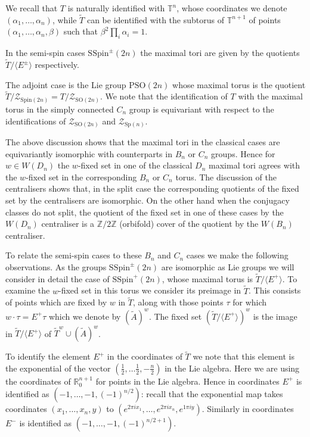 \documentclass[11pt,a4paper]{article}
\def\SSpin{\mathrm{SSpin}}
\def\Spin{\mathrm{Spin}}
\def\SO{\mathrm{SO}}
\def\PSO{\mathrm{PSO}}
\def\Sp{\mathrm{Sp}}
\def\SSpin{\mathrm{SSpin}}
\def\R{\mathbb{R}}
\def\Z{\mathbb{Z}}
\def\Atilde{(\widetilde{A})}
\def\TT{\mathbb{T}}
\def\cZ{\mathcal{Z}}
\def\cZ{{\mathcal Z}}
\def\coveringtorus{\tilde{T}}
\def\ZDSpin{\cZ_{\Spin(2n)}}
\def\ZDSO{\cZ_{\SO(2n)}}
\def\ZCSp{\cZ_{\Sp(n)}}
\begin{document}
We recall that $T$ is naturally identified with $\TT^n$, whose coordinates we denote $(\alpha_1,\dots, \alpha_n)$, while $\coveringtorus$ can be identified with the subtorus of $\TT^{n+1}$ of points $(\alpha_1,\dots, \alpha_n,\beta)$ such that $\beta^2\prod_i\alpha_i=1$.


\bigskip

In the semi-spin cases $\SSpin^\pm(2n)$ the maximal tori are given by the quotients $\coveringtorus / \langle E^\pm\rangle$ respectively. 



The adjoint case is the Lie group $\PSO(2n)$ whose maximal torus is the quotient $\coveringtorus/\ZDSpin=T/\ZDSO$. We note that the identification of $T$ with the maximal torus in the simply connected $C_n$ group is equivariant with respect to the identifications of $\ZDSO$ and $\ZCSp$.

\bigskip







The above discussion shows that  the maximal tori in the classical cases are equivariantly isomorphic with counterparts in $B_n$ or $C_n$ groups. Hence for $w\in W(D_n)$ the $w$-fixed set in one of the classical $D_n$ maximal tori agrees with the $w$-fixed set in the corresponding $B_n$ or $C_n$ torus. The  discussion of the centralisers shows that, in the split case
the corresponding quotients of the fixed set by the centralisers are isomorphic.  On the other hand when the conjugacy classes do not split, the quotient of the fixed set in one of these cases by the $W(D_n)$ centraliser is  a $\Z/2\Z$ (orbifold) cover of the quotient by the $W(B_n)$ centraliser. 

\bigskip

To relate the semi-spin cases to these $B_n$ and $C_n$ cases we make the following observations.  As the groups $\SSpin^\pm(2n)$ are isomorphic as Lie groups we will consider in detail the case of $\SSpin^+(2n)$, whose maximal torus is $\coveringtorus / \langle E^+\rangle$. To examine the $w$-fixed set in this torus we consider its preimage in $\coveringtorus$.  This consists of points which are fixed by $w$ in $\coveringtorus$, along with those points $\tau$ for which $w\cdot \tau =E^+\tau$ which we denote by $\Atilde^w$. The fixed set $(\coveringtorus / \langle E^+\rangle)^w$ is the image in $\coveringtorus/\langle E^+\rangle$ of $\coveringtorus^w\cup \Atilde^w$.

To identify the element $E^+$ in the coordinates of $\coveringtorus$ we note that this element is the exponential of the vector $(\frac 12,\dots \frac 12,-\frac{n}2)$ in the Lie algebra.  Here we are using the coordinates of $\R^{n+1}_0$ for points in the Lie algebra. Hence in coordinates $E^+$ is identified as $(-1,\dots,-1,(-1)^{n/2})$: recall that the exponential map takes coordinates $(x_1,\dots,x_n,y)$ to $(e^{2\pi i x_1},\dots,e^{2\pi i x_n},e^{1\pi i y})$. Similarly in coordinates $E^-$ is identified as $(-1,\dots,-1,(-1)^{n/2+1})$.
\end{document}
